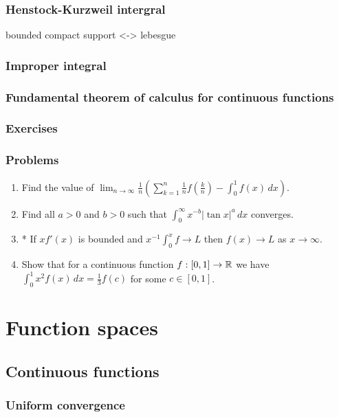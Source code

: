 \documentclass{../../large}
\begin{document}
\section{Henstock-Kurzweil intergral}
bounded compact support <-> lebesgue
\section{Improper integral}
\section{Fundamental theorem of calculus for continuous functions}

\section*{Exercises}

\section*{Problems}
\begin{enumerate}
\item Find the value of $\lim_{n\to\infty}\frac1n\left(\sum_{k=1}^n\frac1nf\left(\frac kn\right)-\int_0^1f(x)\,dx\right)$.
\item Find all $a>0$ and $b>0$ such that $\int_0^\infty x^{-b}|\tan x|^a\,dx$ converges.
\item* If $xf'(x)$ is bounded and $x^{-1}\int_0^xf\to L$ then $f(x)\to L$ as $x\to\infty$.
\item Show that for a continuous function $f:[0,1]\to\mathbb{R}$ we have $\int_0^1x^2f(x)\,dx=\frac13f(c)$ for some $c\in[0,1]$.
\end{enumerate}









\part{Function spaces}

\chapter{Continuous functions}
\section{Uniform convergence}
\end{document}
